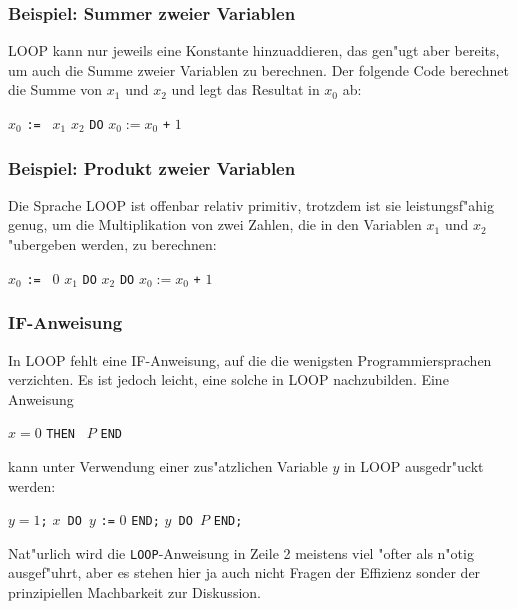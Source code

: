 \subsubsection{Beispiel: Summer zweier Variablen}
LOOP kann nur jeweils eine Konstante hinzuaddieren, das gen"ugt aber
bereits, um auch die Summe zweier Variablen zu berechnen. Der folgende
Code berechnet die Summe von $x_1$ und $x_2$ und legt das Resultat in
$x_0$ ab:
\begin{algorithmic}
\STATE $x_0$ {\tt := } $x_1$
 $x_2$ {\tt DO}
\STATE{\tt \ \ \ \ }$x_0:=x_0$ {\tt +} $1$
\end{algorithmic}

\subsubsection{Beispiel: Produkt zweier Variablen}
Die Sprache LOOP ist offenbar relativ primitiv, trotzdem
ist sie leistungsf"ahig genug, um die Multiplikation von zwei
Zahlen, die in den Variablen $x_1$ und $x_2$ "ubergeben werden,
zu berechnen:

\begin{algorithmic}
\STATE $x_0$ {\tt := } $0$
 $x_1$ {\tt DO}
 $x_2$ {\tt DO}
\STATE{\tt \ \ \ \ \ \ \ \ }$x_0:=x_0$ {\tt +} $1$
\end{algorithmic}

\subsubsection{IF-Anweisung}
In LOOP fehlt eine IF-Anweisung, auf die die wenigsten Programmiersprachen
verzichten. Es ist jedoch leicht, eine solche in LOOP nachzubilden.
Eine Anweisung
\begin{algorithmic}
 $x = 0$ {\tt THEN } $P$ {\tt END}
\end{algorithmic}
kann unter Verwendung einer zus"atzlichen Variable $y$ in LOOP ausgedr"uckt
werden:
\begin{algorithmic}[1]
\STATE $y=1${\tt ;}
$x${\tt\ DO }$y$ {\tt :=} $0$ {\tt END;}
$y${\tt\ DO }$P$ {\tt END;}
\end{algorithmic}
Nat"urlich wird die {\tt LOOP}-Anweisung in Zeile 2 meistens viel "ofter
als n"otig ausgef"uhrt, aber es stehen hier ja auch nicht Fragen
der Effizienz sonder der prinzipiellen Machbarkeit zur Diskussion.


